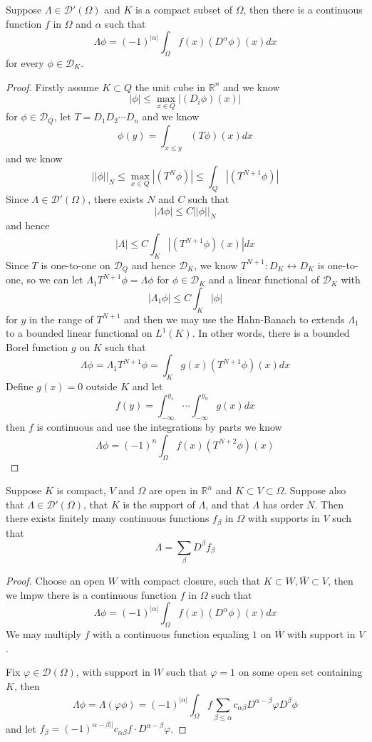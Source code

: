 \documentclass[lang=en, color=blue, ]{elegantbook}
\newcommand{\R}{\mathbb{R}}
\newcommand{\D}{\mathscr{D}}
\begin{document}
\begin{theorem}
    Suppose $\Lambda \in \D'(\Omega)$ and $K$ is a compact subset of $\Omega$, then there is a continuous function $f$ in $\Omega$ and $\alpha$ such that
    \[\Lambda \phi = (-1)^{|\alpha|} \int_{\Omega}f(x)(D^{\alpha}\phi)(x) dx\]
    for every $\phi \in \D_K$.
\end{theorem}
\begin{proof}
    Firstly assume $K\subset Q$ the unit cube in $\R^n$ and we know
    \[
    |\phi| \leq \max_{x\in Q}|(D_i \phi)(x)|
    \]
    for $\phi \in \D_Q$, let $T = D_1D_2\cdots D_n$ and we know
    \[
    \phi(y) = \int_{x \leq y}(T\phi)(x)dx
    \]
    and we know
    \[
    ||\phi||_N \leq \max_{x\in Q}|(T^N\phi)| \leq \int_Q|(T^{N+1}\phi)|
    \]
    Since $\Lambda \in \D'(\Omega)$, there exists $N$ and $C$ such that
    \[|\Lambda \phi| \leq C||\phi||_N\]
    and hence
    \[
    |\Lambda| \leq C\int_K|(T^{N+1} \phi)(x)| dx
    \]
    Since $T$ is one-to-one on $\D_Q$  and hence $\D_K$, we know $T^{N+1}: D_K \leftrightarrow D_K$ is one-to-one, so we can let $\Lambda_1 T^{N+1}\phi = \Lambda \phi$ for $\phi \in \D_K$ and a linear functional of $\D_K$ with
    \[
    |\Lambda_1\phi| \leq C\int_K|\phi|
    \]
    for $y$ in the range of $T^{N+1}$ and then we may use the Hahn-Banach to extends $\Lambda_1$ to a bounded linear functional on $L^1(K)$. In other words, there is a bounded Borel function $g$ on $K$ such that
    \[
    \Lambda \phi = \Lambda_1T^{N+1}\phi = \int_K g(x)(T^{N+1} \phi)(x)dx
    \]
    Define $g(x) = 0$ outside $K$ and let 
    \[f(y) = \int_{-\infty}^{y_1}\cdots\int_{-\infty}^{y_n}g(x) dx\]
    then $f$ is continuous and use the integrations by parts we know
    \[
    \Lambda \phi = (-1)^n \int_{\Omega}f(x)(T^{N+2}\phi)(x)
    \]
\end{proof}

\begin{theorem}
    Suppose $K$ is compact, $V$ and $\Omega$ are open in $\R^n$ and $K\subset V\subset \Omega$. Suppose also that $\Lambda \in \D'(\Omega)$, that $K$ is the support of $\Lambda$, and that $\Lambda$ has order $N$. Then there exists finitely many continuous functions $f_{\beta}$ in $\Omega$ with supports in $V$ such that
    \[\Lambda = \sum_{\beta}D^{\beta}f_{\beta}\] 
\end{theorem}
\begin{proof}
    Choose an open $W$ with compact closure, such that $K\subset W, \overline{W}\subset V$, then we lmpw there is a continuous function $f$ in $\Omega$ such that
    \[\Lambda \phi = (-1)^{|\alpha|} \int_{\Omega}f(x)(D^{\alpha}\phi)(x) dx\]
    We may multiply $f$ with a continuous function equaling $1$ on $\overline{W}$ with support in $V$.\par
    Fix $\varphi \in \D(\Omega)$, with support in $W$ such that $\varphi = 1$ on some open set containing $K$, then
    \[
    \Lambda \phi = \Lambda(\varphi\phi) = (-1)^{|\alpha|}\int_{\Omega} f\sum_{\beta \leq \alpha}c_{\alpha\beta}D^{\alpha-\beta}\varphi D^{\beta}\phi
    \]
    and let $f_{\beta} = (-1)^{\alpha-\beta||}c_{\alpha\beta}f\cdot D^{\alpha-\beta}\varphi$.
\end{proof}
\end{document}
